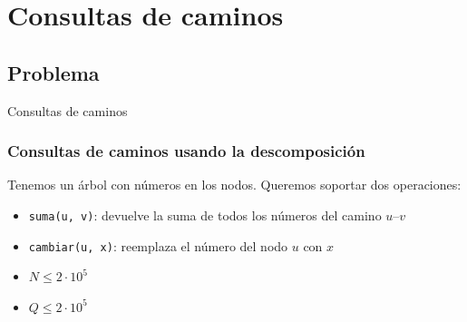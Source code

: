 \section{Consultas de caminos}

\subsection{Problema}

\begin{frame}
  \centering
  \huge Consultas de caminos
\end{frame}

\begin{frame}
  \frametitle{Consultas de caminos usando la descomposición}

  Tenemos un árbol con números en los nodos. Queremos soportar dos operaciones:

  \begin{itemize}
    \item \texttt{suma(u, v)}: devuelve la suma de todos los números del camino \(u\)--\(v\)
    \item \texttt{cambiar(u, x)}: reemplaza el número del nodo \(u\) con \(x\)
    \item \(N \le 2 \cdot 10^5\)
    \item \(Q \le 2 \cdot 10^5\)
  \end{itemize}
\end{frame}
